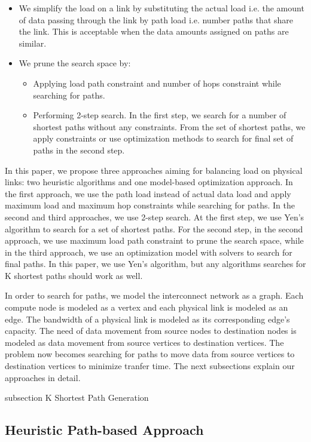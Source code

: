 \begin{itemize}
\item We simplify the load on a link by substituting the actual load i.e. the amount of data passing through the link by path load i.e. number paths that share the link. This is acceptable when the data amounts assigned on paths are similar.
\item We prune the search space by:
\begin{itemize}
\item Applying load path constraint and number of hops constraint while searching for paths.
\item Performing 2-step search. In the first step, we search for a number of shortest paths without any constraints. From the set of shortest paths, we apply constraints or use optimization methods to search for final set of paths in the second step.
\end{itemize}
\end{itemize}

In this paper, we propose three approaches aiming for balancing load on physical links: two heuristic algorithms and one model-based optimization approach. In the first approach, we use the path load instead of actual data load and apply maximum load and maximum hop constraints while searching for paths. In the second and third approaches, we use 2-step search. At the first step, we use Yen's algorithm \cite{Yen:Kpath} to search for a set of shortest paths. For the second step, in the second approach, we use maximum load path constraint to prune the search space, while in the third approach, we use an optimization model with solvers to search for final paths. In this paper, we use Yen's algorithm, but any algorithms searches for K shortest paths should work as well.

In order to search for paths, we model the interconnect network as a graph. Each compute node is modeled as a vertex and each physical link is modeled as an edge. The bandwidth of a physical link is modeled as its corresponding edge's capacity. The need of data movement from source nodes to destination nodes is modeled as data movement from source vertices to destination vertices. The problem now becomes searching for paths to move data from source vertices to destination vertices to minimize tranfer time. The next subsections explain our approaches in detail.

subsection {K Shortest Path Generation}

\subsection{Heuristic Path-based Approach}

